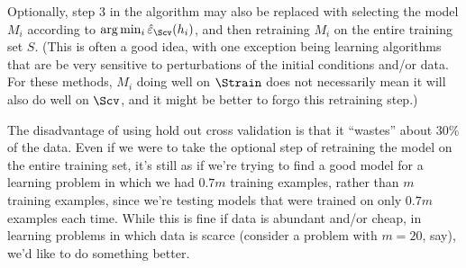 \documentclass{article}
\begin{document}
Optionally, step 3 in the algorithm may also be replaced with selecting the model 
$M_i$ according to $\arg \min_i \ehat_{\Scv}(h_i)$, and then retraining
$M_i$ on the entire training set $S$.  (This is often a good idea,
with one exception being learning algorithms that are be very sensitive to 
perturbations of the initial conditions and/or data.  
For these methods, $M_i$ doing well on $\Strain$ does not necessarily 
mean it will also do well on $\Scv$, and it might be better to forgo 
this retraining step.) 

The disadvantage of using hold out cross validation is that it ``wastes'' about 30\% of the data. 
Even if we were to take the optional step of retraining the model on the 
entire training set, it's still as if we're trying to find a good model for
a learning problem in which we had $0.7m$ training examples, rather than $m$
training examples, since we're testing models that were trained on only $0.7m$
examples each time.  While this is fine if data is abundant and/or cheap,
in learning problems in which data is scarce (consider a problem with $m=20$, say), 
we'd like to do something better.
\end{document}
